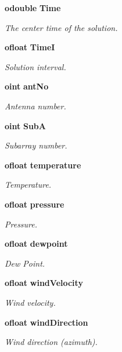 \begin{CompactItemize}
{\bf odouble} {\bf Time}
\begin{CompactList}\small\item\em The center time of the solution. \item\end{CompactList}\item 
{\bf ofloat} {\bf Time\-I}
\begin{CompactList}\small\item\em Solution interval. \item\end{CompactList}\item 
{\bf oint} {\bf ant\-No}
\begin{CompactList}\small\item\em Antenna number. \item\end{CompactList}\item 
{\bf oint} {\bf Sub\-A}
\begin{CompactList}\small\item\em Subarray number. \item\end{CompactList}\item 
{\bf ofloat} {\bf temperature}
\begin{CompactList}\small\item\em Temperature. \item\end{CompactList}\item 
{\bf ofloat} {\bf pressure}
\begin{CompactList}\small\item\em Pressure. \item\end{CompactList}\item 
{\bf ofloat} {\bf dewpoint}
\begin{CompactList}\small\item\em Dew Point. \item\end{CompactList}\item 
{\bf ofloat} {\bf wind\-Velocity}
\begin{CompactList}\small\item\em Wind velocity. \item\end{CompactList}\item 
{\bf ofloat} {\bf wind\-Direction}
\begin{CompactList}\small\item\em Wind direction (azimuth). \item\end{CompactList}\item 

\end{CompactItemize}

